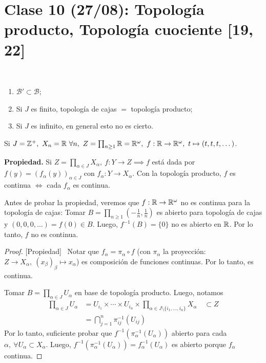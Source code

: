 
\section{Clase 10 (27/08): Topología producto, Topología cuociente [19, 22]}

\begin{remark}~
	\begin{enumerate}
		\item $\mathcal{B}' \subset \mathcal{B}$;

		\item Si $J$ es finito, topología de cajas $=$ topología producto;

		\item Si $J$ es infinito, en general esto no es cierto.
	\end{enumerate}
\end{remark}

\begin{eg}
	Si $J = \mathbb{Z}^+,\ X_n = \mathbb{R} \ \forall n,\ Z = \prod_{n\geq 1} \mathbb{R} = \mathbb{R}^{\omega},\ f: \mathbb{R} \to \mathbb{R}^{\omega},\ t \mapsto (t,t,t,\dots)$.
\end{eg}

\noindent \textbf{Propiedad.} Si $Z = \prod_{\alpha \in J} X_{\alpha},\ f: Y \to Z \implies f$ está dada por $f(y) = (f_{\alpha}(y))_{\alpha \in J}$ con $f_{\alpha}: Y \to X_{\alpha}$. Con la topología producto, $f$ es continua $\iff$ cada $f_{\alpha}$ es continua. \newline

\noindent Antes de probar la propiedad, veremos que $f:\mathbb{R} \to \mathbb{R}^{\omega}$ no es continua para la topología de cajas: Tomar $B = \prod_{n\geq 1} \left( -\frac{1}{n}, \frac{1}{n}\right)$ es abierto para topología de cajas y $(0,0,0,\dots) = f(0) \in B$. Luego, $f^{-1}(B) = \{0\}$ no es abierto en $\mathbb{R}$. Por lo tanto, $f$ no es continua. \newline

\begin{proof}[Proof][Propiedad]~
	\Onlyifstep Notar que $f_{\alpha} = \pi_{\alpha} \circ f$ (con $\pi_{\alpha}$ la proyección: $Z\to X_{\alpha},\ (x_{\beta})_{\beta} \mapsto x_{\alpha}$) es composición de funciones continuas. Por lo tanto, es continua.\newline

	\noindent \Ifstep Tomar $B = \prod_{\alpha \in J} U_{\alpha}$ en base de topología producto. Luego, notamos
	\begin{align*}
		\prod_{\alpha \in J} U_{\alpha} & = U_{i_1} \times \cdots \times U_{i_n} \times \prod_{\alpha \in J \setminus \{i_1,\dots,i_n\}  } X_{\alpha} \quad \subset Z \\
		& = \bigcap_{j=1}^{n} \pi_{ij}^{-1} (U_{ij})
	\end{align*}
	Por lo tanto, suficiente probar que $f^{-1}(\pi_{\alpha}^{-1}(U_{\alpha}))$ abierto para cada $\alpha,\ \forall U_{\alpha} \subset X_{\alpha}$. Luego, $f^{-1}(\pi_{\alpha}^{-1}(U_{\alpha})) = f_{\alpha}^{-1}(U_{\alpha})$ es abierto porque $f_{\alpha}$ continua.
\end{proof}

